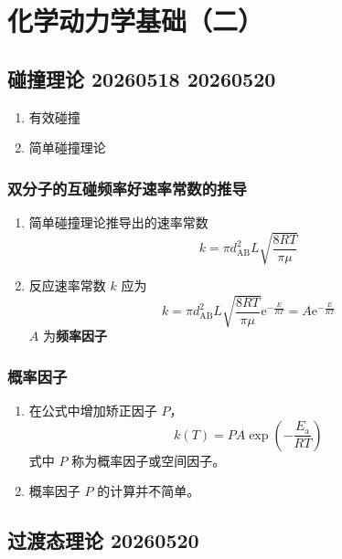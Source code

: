 \section{化学动力学基础（二）}

\subsection{碰撞理论 20260518 20260520}

\begin{enumerate}
    \item 有效碰撞
    \item 简单碰撞理论
\end{enumerate}

\subsubsection{双分子的互碰频率好速率常数的推导}

\begin{enumerate}
    \item 简单碰撞理论推导出的速率常数
    \begin{equation}
        k = \pi d_{\mathrm{AB}}^2 L \sqrt{\frac{8RT}{\pi \mu}}
    \end{equation}
    \item 反应速率常数 $k$ 应为
    \begin{equation}
        k = \pi d_{\mathrm{AB}}^2 L \sqrt{\frac{8RT}{\pi \mu}} \mathrm{e}^{-\frac{E}{RT}} = A \mathrm{e}^{-\frac{E}{RT}}
    \end{equation}
    $A$ 为\textbf{频率因子}
\end{enumerate}

\subsubsection{概率因子}

\begin{enumerate}
    \item 在公式中增加矫正因子 $P$，
    \begin{equation}
        k(T) = P A \exp\left(-\frac{E_{\mathrm{a}}}{RT}\right)
    \end{equation}
    式中 $P$ 称为概率因子或空间因子。
    \item 概率因子 $P$ 的计算并不简单。
\end{enumerate}

\subsection{过渡态理论 20260520}

